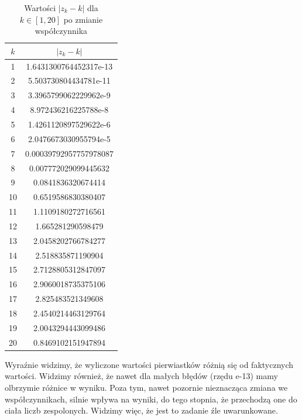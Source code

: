 \documentclass{article}
\begin{document}
\begin{table}[h]
  \centering
  \begin{tabular}{|c|c|}
    \hline
    $k$ & $|z_k - k|$ \\
    \hline
    1 & 1.6431300764452317e-13\\
    2 & 5.503730804434781e-11\\
    3 & 3.3965799062229962e-9\\
    4 & 8.972436216225788e-8\\
    5 & 1.4261120897529622e-6\\
    6 & 2.0476673030955794e-5\\
    7 & 0.00039792957757978087\\
    8 & 0.007772029099445632\\
    9 & 0.0841836320674414\\
    10 & 0.6519586830380407\\
    11 & 1.1109180272716561\\
    12 & 1.665281290598479\\
    13 & 2.0458202766784277\\
    14 & 2.518835871190904\\
    15 & 2.7128805312847097\\
    16 & 2.9060018735375106\\
    17 & 2.825483521349608\\
    18 & 2.4540214463129764\\
    19 & 2.0043294443099486\\
    20 & 0.8469102151947894\\
    \hline
  \end{tabular}
  \caption{Wartości $|z_k - k|$ dla $k \in [1,20]$ po zmianie współczynnika}
\end{table}

Wyraźnie widzimy, że wyliczone wartości pierwiastków różnią się od
faktycznych wartości. Widzimy również, że nawet dla małych błędów
(rzędu e-13) mamy olbrzymie różnice w wyniku. Poza tym, nawet
pozornie nieznacząca zmiana we współczynnikach, silnie wpływa na wyniki,
do tego stopnia, że przechodzą one do ciała liczb zespolonych.
Widzimy więc, że jest to zadanie źle uwarunkowane.
\end{document}
